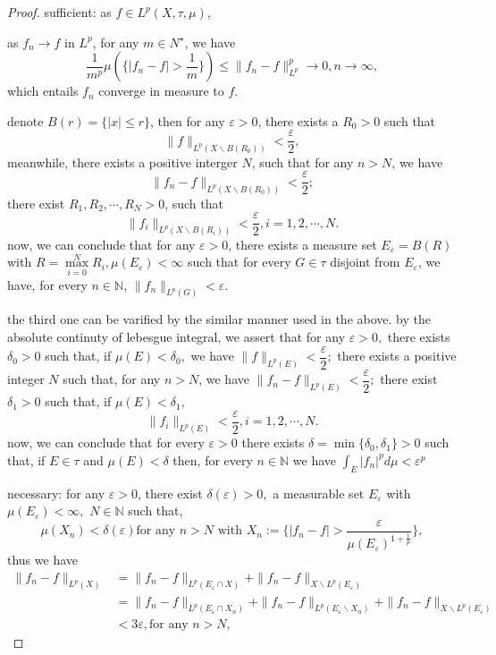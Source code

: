 \begin{proof}
	sufficient: as $ f\in L^p(X, \tau, \mu) $,
	
	as $ f_n \rightarrow f $ in $ L^p $, for any $ m\in N^\star $, we have $$\frac{1}{m^p} \mu(\{|f_n-f|>\frac{1}{m}\}) \leqslant \|f_n-f\|_{L^p}^p\rightarrow 0, n\rightarrow\infty,$$
	which entails $ f_n $ converge in measure to $ f $.
	
	denote $ B(r) = \{|x|\leqslant r\} $, then for any $ \varepsilon>0 $, there exists a $R_0>0$ such that \[ \|f\|_{L^p(X\backslash B(R_0))} < \frac{\varepsilon}{2},\]
	meanwhile, there exists a positive interger $ N $, such that for any $ n>N $, we have 
	\[ \|f_n-f\|_{L^p(X\backslash B(R_0))} < \frac{\varepsilon}{2};\]
	there exist $ R_1, R_2, \cdots, R_N > 0 $, such that 
	\[ \|f_i\|_{L^p(X\backslash B(R_i))} < \frac{\varepsilon}{2}, i = 1, 2, \cdots, N.\]
	now, we can conclude that for any $ \varepsilon>0 $, there exists a measure set $ E_\varepsilon = B(R)$ with $ R = \max\limits_{i=0}^N R_i,\mu(E_\varepsilon)<\infty $ such that for every $ G\in\tau $ disjoint from $ E_\varepsilon $, we have, for every $ n\in \mathbb{N} $, $ \|f_n\|_{L^p(G)}<\varepsilon $.
	
	the third one can be varified by the similar manner used in the above. by the absolute continuty of lebesgue integral, we assert that for any $ \varepsilon>0, $ there exists $ \delta_0>0 $ such that, if $ \mu(E)<\delta_0, $ we have $ \|f\|_{L^p(E)} < \dfrac\varepsilon2; $ there exists a positive integer $ N $ such that, for any $ n>N $, we have $ \|f_n-f\|_{L^p(E)} < \dfrac{\varepsilon}{2};$ there exist $ \delta_1 > 0  $ such that, if $ \mu(E)< \delta_1, $ 
	\[ \|f_i\|_{L^p(E)} < \frac{\varepsilon}{2}, i = 1, 2, \cdots, N.\]
	now, we can conclude that for  every $\varepsilon>0$ there exists $\delta=\min\{\delta_0, \delta_1\}>0$ such that, if $E \in \tau$ and $\mu(E)<\delta$ then, for every $n \in \mathbb{N}$ we have $\int_{E}\left|f_{n}\right|^{p} d \mu<\varepsilon^{p}$	
	
	necessary: for any $ \varepsilon>0 $, there exist $ \delta(\varepsilon)>0,$ a measurable set $ E_\varepsilon $ with $ \mu(E_\varepsilon)<\infty, $ $N\in\mathbb{N}$ such that, 
	\[ \mu(X_n) < \delta(\varepsilon) \text{for any } n > N \text{ with } X_n:=\{|f_n-f|>\dfrac{\varepsilon}{\mu(E_\varepsilon)^{1+\frac{1}{p}}}\},\]
	thus we have
	\begin{equation*}
		\begin{split}
			\|f_n-f\|_{L^p(X)} &= \|f_n-f\|_{L^p(E_\varepsilon\cap X)} + \|f_n-f\|_{X\backslash L^p(E_\varepsilon)}\\
			&= \|f_n-f\|_{L^p(E_\varepsilon\cap X_n)} + \|f_n-f\|_{L^p(E_\varepsilon\backslash X_n)} +
			\|f_n-f\|_{X\backslash L^p(E_\varepsilon)}\\
			&< 3\varepsilon, \text{for any } n>N,
		\end{split}
	\end{equation*}
\end{proof}


